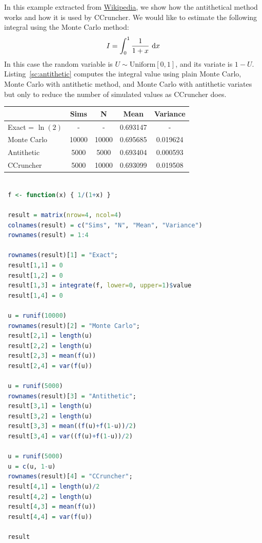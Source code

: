 \documentclass[11pt,fleqn]{book} %
\begin{document}
\begin{example}
	In this example extracted from 
	\href{http://en.wikipedia.org/wiki/Antithetic_variates}{Wikipedia}, we 
	show how the antithetical method works and how it is used by CCruncher. 
	We would like to estimate the following integral using the Monte Carlo 
	method:
	\begin{displaymath}
	I = \displaystyle \int_0^1 \frac{1}{1+x} \mathop{\,\mathrm{{}d}}\mathopen{} x
	\end{displaymath}
	In this case the random variable is $U \sim \text{Uniform}[0,1]$, and 
	its variate is $1-U$. Listing~\ref{sc:antithetic} computes the integral 
	value using plain Monte Carlo, Monte Carlo with antithetic method, and 
	Monte Carlo with antithetic variates but only to reduce the number of 
	simulated values as CCruncher does.
	\\
	\hspace*{1cm}
	\begin{tabular}{l|c|c|c|c|}
		\cline{2-5}
		& Sims & N & Mean & Variance \\
		\hline
		\multicolumn{1}{|l|}{Exact = $\ln(2)$} & - & - & 0.693147 & - \\
		\hline
		\multicolumn{1}{|l|}{Monte Carlo} & 10000 & 10000 & 0.695685 & 0.019624 \\
		\hline
		\multicolumn{1}{|l|}{Antithetic} & 5000 & 5000 & 0.693404 & 0.000593 \\
		\hline
		\multicolumn{1}{|l|}{CCruncher} & 5000 & 10000 & 0.693099 & 0.019508 \\
		\hline
	\end{tabular}
\end{example}

\begin{lstlisting}[language=R, label=sc:antithetic, caption=Antithetic example (R script)]

 f <- function(x) { 1/(1+x) }
 
 result = matrix(nrow=4, ncol=4)
 colnames(result) = c("Sims", "N", "Mean", "Variance")
 rownames(result) = 1:4

 rownames(result)[1] = "Exact";
 result[1,1] = 0
 result[1,2] = 0
 result[1,3] = integrate(f, lower=0, upper=1)$value
 result[1,4] = 0

 u = runif(10000)
 rownames(result)[2] = "Monte Carlo";
 result[2,1] = length(u)
 result[2,2] = length(u)
 result[2,3] = mean(f(u))
 result[2,4] = var(f(u))

 u = runif(5000)
 rownames(result)[3] = "Antithetic";
 result[3,1] = length(u)
 result[3,2] = length(u)
 result[3,3] = mean((f(u)+f(1-u))/2)
 result[3,4] = var((f(u)+f(1-u))/2)

 u = runif(5000)
 u = c(u, 1-u)
 rownames(result)[4] = "CCruncher";
 result[4,1] = length(u)/2
 result[4,2] = length(u)
 result[4,3] = mean(f(u))
 result[4,4] = var(f(u))
 
 result

\end{lstlisting}
\end{document}
